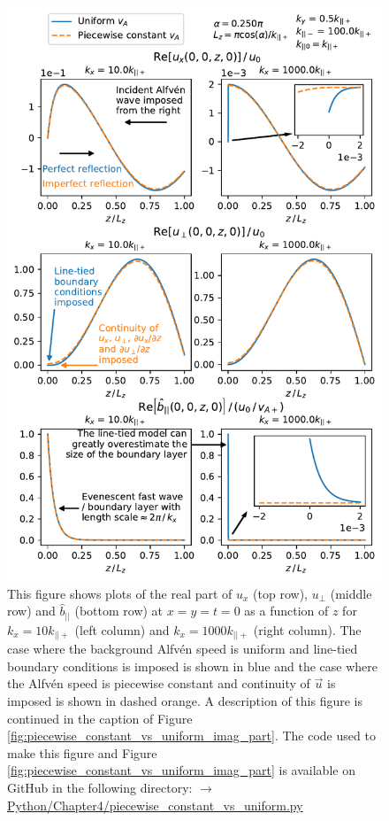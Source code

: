 \begin{figure}
    \centering
    \vspace{-20pt}
    \includegraphics[width=\textwidth,height=0.8\textheight,keepaspectratio]{figures/chapter04/piecewise_constant_vs_uniform_real_part.pdf}
    \vspace{-10pt}
    \caption{This figure shows plots of the real part of $u_x$ (top row), $u_\perp$ (middle row) and $\hat{b}_{||}$ (bottom row) at $x=y=t=0$ as a function of $z$ for $k_x=10k_{||+}$ (left column) and $k_x = 1000k_{||+}$ (right column). The case where the background Alfv\'en speed is uniform and line-tied boundary conditions is imposed is shown in blue and the case where the Alfv\'en speed is piecewise constant and continuity of $\vec{u}$ is imposed is shown in dashed orange. A description of this figure is continued in the caption of Figure \ref{fig:piecewise_constant_vs_uniform_imag_part}. The code used to make this figure and Figure \ref{fig:piecewise_constant_vs_uniform_imag_part} is available on GitHub in the following directory:\newline
    \href{https://github.com/aleksyprok/apkp_thesis/blob/main/Python/Chapter4/piecewise_constant_vs_uniform.py}{$\rightarrow$ Python/Chapter4/piecewise\_constant\_vs\_uniform.py}}
    \label{fig:piecewise_constant_vs_uniform_real_part}
    \vspace{-20pt}
\end{figure}

